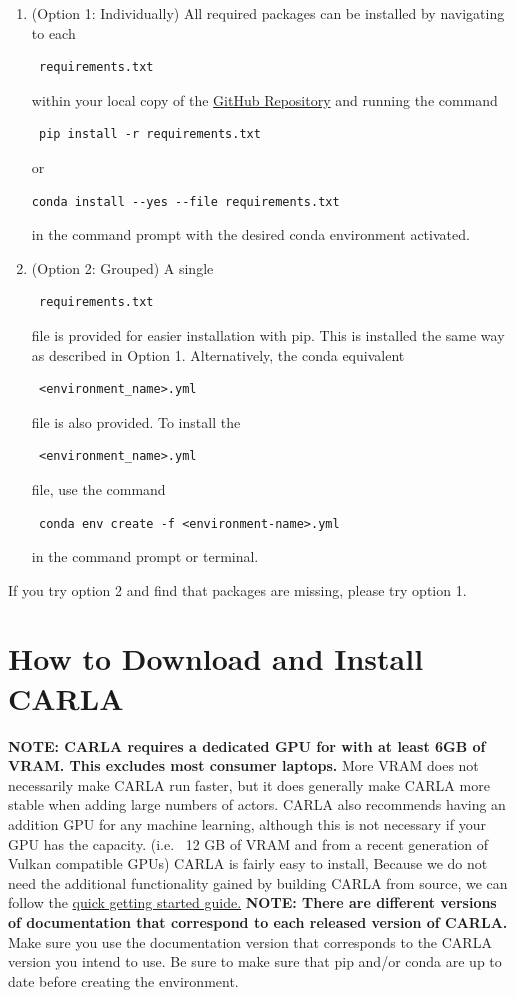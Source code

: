 \documentclass[12pt,oneside,letterpaper]{article}
\begin{document}
\begin{enumerate}
\item(Option 1: Individually) All required packages can be installed by navigating to each \begin{verbatim} requirements.txt \end{verbatim} within your local copy of the \href{https://github.com/hrwhite21/RL_CARLA_ADAS}{GitHub Repository} and running the command \begin{verbatim} pip install -r requirements.txt \end{verbatim} or \begin{verbatim}conda install --yes --file requirements.txt \end{verbatim} in the command prompt with the desired conda environment activated.
\item(Option 2: Grouped) A single \begin{verbatim} requirements.txt \end{verbatim} file is provided for easier installation with pip. This is installed the same way as described in Option 1. Alternatively, the conda equivalent \begin{verbatim} <environment_name>.yml \end{verbatim} file is also provided. To install the \begin{verbatim} <environment_name>.yml \end{verbatim} file, use the command \begin{verbatim} conda env create -f <environment-name>.yml \end{verbatim} in the command prompt or terminal.
\end{enumerate} 

If you try option 2 and find that packages are missing, please try option 1.

\section{How to Download and Install CARLA}
\label{sec:CARLAInstall}
\textbf{NOTE: CARLA requires a dedicated GPU for with at least 6GB of VRAM. This excludes most consumer laptops.} More VRAM does not necessarily make CARLA run faster, but it does generally make CARLA more stable when adding large numbers of actors. CARLA also recommends having an addition GPU for any machine learning, although this is not necessary if your GPU has the capacity. (i.e. ~12 GB of VRAM and from a recent generation of Vulkan compatible GPUs)
CARLA is fairly easy to install, %
Because we do not need the additional functionality gained by building CARLA from source, we can follow the \href{https://carla.readthedocs.io/en/latest/start_quickstart/}{quick getting started guide.} \textbf{NOTE: There are different versions of documentation that correspond to each released version of CARLA.} Make sure you use the documentation version that corresponds to the CARLA version you intend to use. Be sure to make sure that pip and/or conda are up to date before creating the environment. \\
\end{document}
